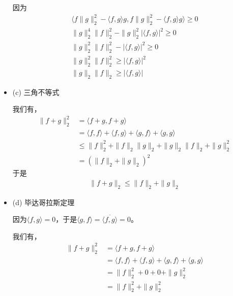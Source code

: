 \documentclass{article}
\begin{document}
\begin{itemize}
        因为
        \begin{align*}
          \langle f\|g\|_2^2 - \langle f, g \rangle g, f\|g\|_2^2 - \langle f, g \rangle g \rangle \geq 0 \\
          \|g\|_2^4\|f\|_2^2 - \|g\|_2^2|\langle  f, g \rangle|^2 \geq 0                                  \\
          \|g\|_2^2\|f\|_2^2 - |\langle  f, g \rangle|^2 \geq 0                                           \\
          \|g\|_2^2\|f\|_2^2 \geq |\langle  f, g \rangle|^2                                               \\
          \|g\|_2\|f\|_2 \geq |\langle  f, g \rangle|
        \end{align*}


  \item (c) 三角不等式

        我们有，
        \begin{align*}
          \|f + g\|_2^2 & = \langle f + g, f + g \rangle                                                              \\
                        & = \langle f, f \rangle + \langle f, g \rangle + \langle g, f \rangle + \langle g, g \rangle \\
                        & \leq \|f\|_2^2 + \|f\|_2\|g\|_2 + \|g\|_2\|f\|_2 + \|g\|_2^2                                \\
                        & = (\|f\|_2 + \|g\|_2)^2
        \end{align*}
        于是
        \begin{align*}
          \|f + g\|_2 \leq \|f\|_2 + \|g\|_2
        \end{align*}

  \item (d) 毕达哥拉斯定理

        因为$\langle f, g \rangle = 0$，于是$\langle g, f \rangle = \overline{\langle f, g \rangle} = 0$。

        我们有，
        \begin{align*}
          \|f + g\|_2^2 & = \langle f + g, f + g \rangle                                                              \\
                        & = \langle f, f \rangle + \langle f, g \rangle + \langle g, f \rangle + \langle g, g \rangle \\
                        & = \|f\|_2^2 + 0 + 0 + \|g\|_2^2                                                             \\
                        & = \|f\|_2^2 + \|g\|_2^2
        \end{align*}


\end{itemize}
\end{document}
